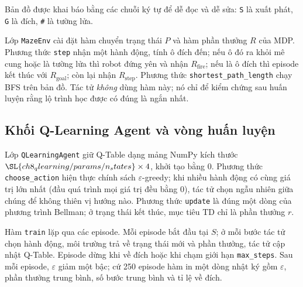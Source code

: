 Bản đồ được khai báo bằng các chuỗi ký tự để dễ đọc và dễ sửa: \texttt{S} là xuất phát, \texttt{G} là đích,
\texttt{\#} là tường lửa.


Lớp \texttt{MazeEnv} cài đặt hàm chuyển trạng thái $P$ và hàm phần thưởng $R$ của MDP. Phương thức \texttt{step} nhận
một hành động, tính ô đích đến; nếu ô đó ra khỏi mê cung hoặc là tường lửa thì robot đứng yên và nhận
$R_{\text{fire}}$; nếu là ô đích thì episode kết thúc với $R_{\text{goal}}$; còn lại nhận $R_{\text{step}}$. Phương
thức \texttt{shortest\_path\_length} chạy BFS trên bản đồ. Tác tử \emph{không} dùng hàm này; nó chỉ để kiểm chứng sau
huấn luyện rằng lộ trình học được có đúng là ngắn nhất.


\subsection{Khối Q-Learning Agent và vòng huấn luyện}

Lớp \texttt{QLearningAgent} giữ Q-Table dạng mảng NumPy kích thước $\SL{ch8_qlearning/params/n_states} \times 4$,
khởi tạo bằng 0. Phương thức \texttt{choose\_action} hiện thực chính sách $\varepsilon$-greedy; khi nhiều hành động có
cùng giá trị lớn nhất (đầu quá trình mọi giá trị đều bằng 0), tác tử chọn ngẫu nhiên giữa chúng để không thiên vị
hướng nào. Phương thức \texttt{update} là đúng một dòng của phương trình Bellman; ở trạng thái kết thúc, mục tiêu TD chỉ
là phần thưởng $r$.


Hàm \texttt{train} lặp qua các episode. Mỗi episode bắt đầu tại $S$; ở mỗi bước tác tử chọn hành động, môi trường trả
về trạng thái mới và phần thưởng, tác tử cập nhật Q-Table. Episode dừng khi về đích hoặc khi chạm giới hạn
\texttt{max\_steps}. Sau mỗi episode, $\varepsilon$ giảm một bậc; cứ 250 episode hàm in một dòng nhật ký gồm
$\varepsilon$, phần thưởng trung bình, số bước trung bình và tỉ lệ về đích.

